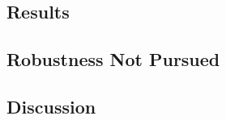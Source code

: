 \subsection{Results}\label{sec:import_leakage:results}


\subsection{Robustness Not Pursued}\label{sec:import_leakage:notpursued}


\subsection{Discussion}\label{sec:import_leakage:discussion}

